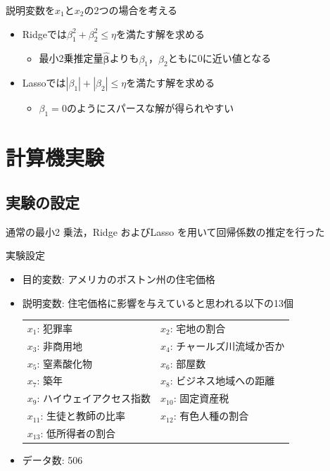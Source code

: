\documentclass[dvipdfmx, 10pt]{beamer}
\begin{document}
\begin{frame}{\insertsubsection}
\begin{figure}[Ht]
\begin{tabular}{cc}
    	     \end{tabular}
    \end{figure}
    説明変数を$x_1$と$x_2$の2つの場合を考える
    \begin{itemize}
    	\item Ridgeでは$\beta_1^2 + \beta_2^2 \le \eta$を満たす解を求める
		\begin{itemize}
			\item 最小2乗推定量$\hat{\bm{\beta}}$よりも$\beta_1$，$\beta_2$ともに0に近い値となる
	    	\end{itemize}
	\item Lassoでは$|\beta_1| + |\beta_2| \le \eta$を満たす解を求める
		\begin{itemize}
			\item $\beta_1 = 0$のようにスパースな解が得られやすい
		\end{itemize}
    \end{itemize}
\end{frame}

\section{計算機実験}
\subsection{実験の設定}
\begin{frame}{\insertsubsection}
    通常の最小2 乗法，Ridge およびLasso を用いて回帰係数の推定を行った
    \begin{block}{実験設定}
        \begin{itemize}
                \item 目的変数: アメリカのボストン州の住宅価格
                \item 説明変数: 住宅価格に影響を与えていると思われる以下の13個
                    \begin{table}[htb]
                    	\begin{tabular}{ll}
                    	$x_1$: 犯罪率  & $x_2$: 宅地の割合\\
                    	$x_3$: 非商用地 &  $x_4$: チャールズ川流域か否か\\
                    	$x_5$: 窒素酸化物 &  $x_6$: 部屋数\\
                    	$x_7$: 築年 &  $x_8$: ビジネス地域への距離\\
                    	$x_9$: ハイウェイアクセス指数 &  $x_{10}$: 固定資産税\\
                    	$x_{11}$: 生徒と教師の比率 &  $x_{12}$: 有色人種の割合\\
                    	$x_{13}$: 低所得者の割合\\
                    	\end{tabular}
                    \end{table}
                \item データ数: 506
        \end{itemize}
    \end{block}
\end{frame}
\end{document}
